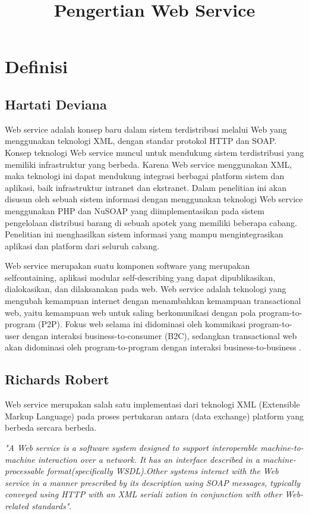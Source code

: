 \documentclass[12pt]{journal}
\begin{document}
\title{Pengertian Web Service}
\maketitle

\section{Definisi}

\subsection{Hartati Deviana}
	Web service adalah konsep baru dalam sistem terdistribusi melalui Web yang menggunakan teknologi XML, dengan standar protokol  HTTP dan SOAP. Konsep teknologi Web service muncul untuk mendukung sistem terdistribusi yang memiliki infrastruktur yang berbeda. Karena Web service menggunakan XML, maka teknologi ini dapat mendukung integrasi berbagai platform sistem dan aplikasi, baik infrastruktur intranet dan ekstranet. Dalam penelitian ini akan disusun oleh sebuah sistem informasi dengan menggunakan teknologi Web service menggunakan PHP dan NuSOAP yang diimplementasikan pada sistem pengelolaan distribusi barang di sebuah apotek yang memiliki beberapa cabang. Penelitian ini menghasilkan sistem informasi yang mampu mengintegrasikan aplikasi dan platform dari seluruh cabang.
	
	Web service merupakan suatu komponen software yang merupakan selfcontaining, aplikasi modular self-describing yang dapat dipublikasikan, dialokasikan, dan dilaksanakan pada web. Web service adalah teknologi yang mengubah kemampuan internet dengan menambahkan kemampuan transactional web, yaitu kemampuan web untuk saling berkomunikasi dengan pola program-to-program (P2P). Fokus web selama ini didominasi oleh komunikasi program-to-user dengan interaksi business-to-consumer (B2C), sedangkan transactional web akan didominasi oleh program-to-program dengan interaksi business-to-business \cite{deviana2013penerapan}.

\subsection{Richards Robert}

Web service merupakan salah satu implementasi dari teknologi XML (Extensible Markup Language) pada proses pertukaran antara (data exchange) platform yang berbeda sercara berbeda.

\textit{"A Web service is a software system designed to support interoperable machine-to-machine interaction over a network. It has an interface described in a machine-processable format(specifically WSDL).Other systems interact with the Web service in a manner prescribed by its description using SOAP messages, typically conveyed using HTTP with an XML seriali zation in conjunction with other Web-related standards"}.
\end{document}
